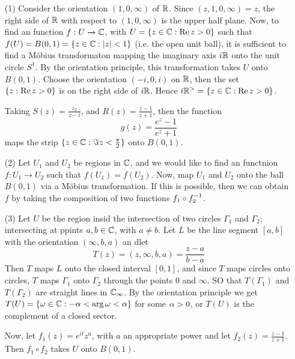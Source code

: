 \begin{example}\label{example_3.11}
    \begin{enumerate}
        \item[(1)] Consider the orientation $(1,0,\infty)$ of $\mathbb{R}$. Since
            $(z,1,0,\infty)=z$, the right side of $\mathbb{R}$ with respect to
            $(1,0,\infty)$ is the upper half plane. Now, to find an
            function $f:U \xrightarrow{} \mathbb{C}$, with $U=\{z \in \mathbb{C} : \operatorname{Re}{z}>0\}$
            such that $f(U)=B(0,1)=\{z \in \mathbb{C} : |z|<1\}$ (i.e. the open unit
            ball), it is sufficient to find a M\"obius transformaton mapping the
            imaginary axis $i\mathbb{R}$ onto the unit circle $S^1$. By the orientation
            principle, this transformation takes  $U$ onto  $B(0,1)$. Choose the
            orientation $(-i,0,i)$ on $\mathbb{R}$, then the set $\{z:\operatorname{Re}{z}>0\}$ is
            on the right side of $i\mathbb{R}$. Hence $i\mathbb{R}^>=\{z \in \mathbb{C} : \operatorname{Re}{z}>0\}$.

            Taking $S(z)=\frac{z_2}{z-i}$, and $R(z)=\frac{z-1}{z+1}$, then the
             function
            \begin{equation*}
                g(z)=\frac{e^z-1}{e^z+1}
            \end{equation*}
            maps the strip $\{z \in \mathbb{C} : \Im{z}<\frac{\pi}{2}\}$ onto $B(0,1)$.

        \item[(2)] Let $U_1$ and $U_2$ be regions in $\mathbb{C}$, and we would like to
            find an  functnion $f:U_1 \xrightarrow{} U_2$ such that
            $f(U_1)=f(U_2)$. Now, map $U_1$ and $U_2$ onto the ball $B(0,1)$ via
            a M\"obius transformation. If this is possible, then we can obtain
            $f$ by taking the composition of two  functions  $f_1 \circ
            f_2^{-1}$.

        \item[(3)] Let $U$ be the region insid the intersection of two circles
            $\Gamma_1$ and $\Gamma_2$; intersecting at ppints $a,b \in \mathbb{C}$, with
             $a \neq b$. Let  $L$ be the line segment $[a,b]$ with the
             orientation $(\infty,b,a)$ an dlet
             \begin{equation*}
                 T(z)=(z,\infty,b,a)=\frac{z-a}{b-a}
             \end{equation*}
             Then $T$ maps  $L$ onto the closed interval $[0,1]$, and since $T$
             maps circles onto circles, $T$ maps $\Gamma_1$ onto $\Gamma_2$
             through the points $0$ and  $\infty$. SO that $T(\Gamma_1)$ and
             $T(\Gamma_2)$ are straight lines in $\mathbb{C}_\infty$. By the orientation
             principle we get  $T(U)=\{\omega \in \mathbb{C} : -\alpha<\arg{\omega}<\alpha\}$ for some
             $\alpha>0$, or  $T(U)$ is the complement of a closed sector.

             Now, let $f_1(z)=e^{it}z^a$, with $a$ an appropriate power and let
             $f_2(z)=\frac{z-1}{z+1}$. Then $f_1 \circ f_2$ takes $U$ onto
             $B(0,1)$.
    \end{enumerate}
\end{example}
